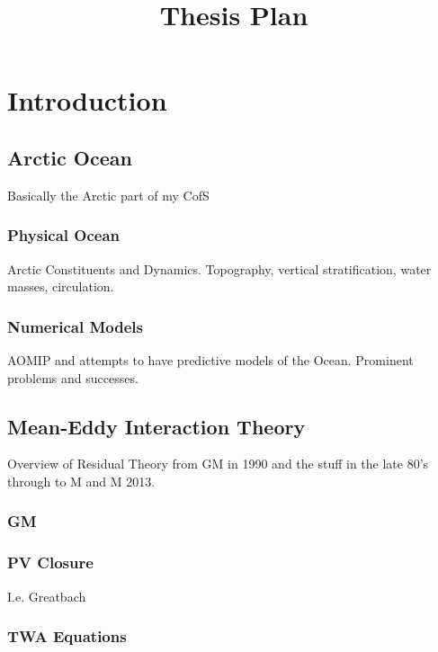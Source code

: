 \documentclass[10pt,a4paper]{article}
\title{Thesis Plan}
\begin{document}
\maketitle


\section{Introduction}

\subsection{Arctic Ocean}

Basically the Arctic part of my CofS

\subsubsection{Physical Ocean}

Arctic Constituents and Dynamics. Topography,
vertical stratification, water masses, circulation.

\subsubsection{Numerical Models}

AOMIP and attempts to have predictive models of
the Ocean. Prominent problems and successes.

\subsection{Mean-Eddy Interaction Theory}

Overview of Residual Theory from GM in 1990 and the
stuff in the late 80's through to M and M 2013.

\subsubsection{GM}

\subsubsection{PV Closure}

I.e. Greatbach

\subsubsection{TWA Equations}
\end{document}
